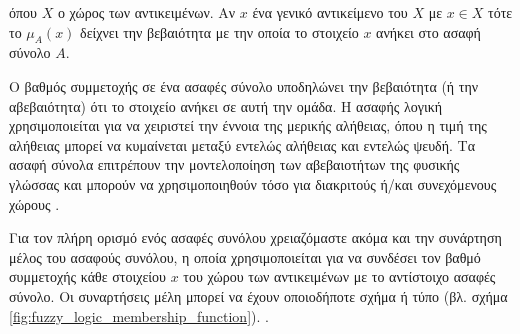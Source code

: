 \documentclass{assignment}
\begin{document}
όπου $X$ ο χώρος των αντικειμένων. Αν $x$ ένα γενικό αντικείμενο του $X$ με $x \in X$ τότε το $\mu_A(x)$ δείχνει την βεβαιότητα με την οποία το στοιχείο $x$ ανήκει στο ασαφή σύνολο $A$.

Ο βαθμός συμμετοχής σε ένα ασαφές σύνολο υποδηλώνει την βεβαιότητα (ή την αβεβαιότητα) ότι το στοιχείο ανήκει σε αυτή την ομάδα. Η ασαφής λογική χρησιμοποιείται για να χειριστεί την έννοια της μερικής αλήθειας, όπου η τιμή της αλήθειας μπορεί να κυμαίνεται μεταξύ εντελώς αλήθειας και εντελώς ψευδή. Τα ασαφή σύνολα επιτρέπουν την μοντελοποίηση των αβεβαιοτήτων της φυσικής γλώσσας και μπορούν να χρησιμοποιηθούν τόσο για διακριτούς ή/και συνεχόμενους χώρους \cite{engelbrecht,class_notes,wiki:fuzzy_logic}. 

Για τον πλήρη ορισμό ενός ασαφές συνόλου χρειαζόμαστε ακόμα και την συνάρτηση μέλος του ασαφούς συνόλου, η οποία χρησιμοποιείται για να συνδέσει τον βαθμό συμμετοχής κάθε στοιχείου $x$ του χώρου των αντικειμένων με το αντίστοιχο ασαφές σύνολο. Οι συναρτήσεις μέλη μπορεί να έχουν οποιοδήποτε σχήμα ή τύπο (βλ. σχήμα \ref{fig:fuzzy_logic_membership_function}). \cite{engelbrecht}.
\end{document}
